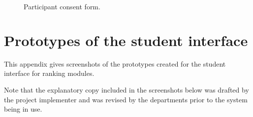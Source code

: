 \documentclass[]{scrartcl}
\begin{document}
\begin{figure}[h]
  \begin{center}
  \end{center}
  \caption{Participant consent form.}
  \label{participantconsent}
\end{figure}

\clearpage
\section{Prototypes of the student interface}
\label{sec:prototypes}

This appendix gives screenshots of the prototypes created for the student
interface for ranking modules.

Note that the explanatory copy included in the screenshots below was drafted
by the project implementer and was revised by the departments prior to the
system being in use.
\end{document}
